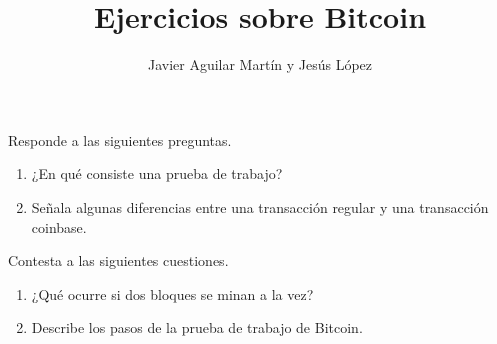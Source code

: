 \documentclass[twoside]{article}
\begin{document}
\title{Ejercicios sobre Bitcoin}
\author{Javier Aguilar Martín y Jesús López}
\maketitle


\begin{ejercicio}{1}
	Responde a las siguientes preguntas.
\begin{enumerate}
\item ¿En qué consiste una prueba de trabajo?

\item Señala algunas diferencias entre una transacción regular y una transacción coinbase.
\end{enumerate}
\end{ejercicio}


\begin{ejercicio}{2}
	Contesta a las siguientes cuestiones.
	\begin{enumerate}
	\item  ¿Qué ocurre si dos bloques se minan a la vez?
	\item Describe los pasos de la prueba de trabajo de Bitcoin.
\end{enumerate}
\end{ejercicio}
\end{document}
